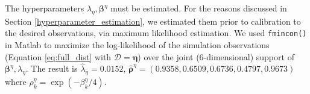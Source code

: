 \documentclass{article}
\begin{document}
The hyperparameters $\lambda_\eta,\boldsymbol \beta^\eta$ must be estimated.
% 
For the reasons discussed in Section \ref{hyperparameter_estimation}, we estimated them prior to calibration to the desired observations, via maximum likelihood estimation.
% 
%
We used \texttt{fmincon()} in {\sc Matlab} %
to maximize the log-likelihood of the simulation observations  (Equation \eqref{eq:full_dist} with $\mathcal D=\boldsymbol\eta$) over the joint (6-dimensional) support of $\boldsymbol \beta^\eta,\lambda_\eta$.  
%
The result is $\hat\lambda_\eta = 0.0152$, $\boldsymbol {\hat\rho}^\eta = (0.9358, 0.6509, 0.6736, 0.4797, 0.9673)$
where $\rho^\eta_k = \exp(-\beta_k^\eta/4)$. 

%
%
%
\end{document}
